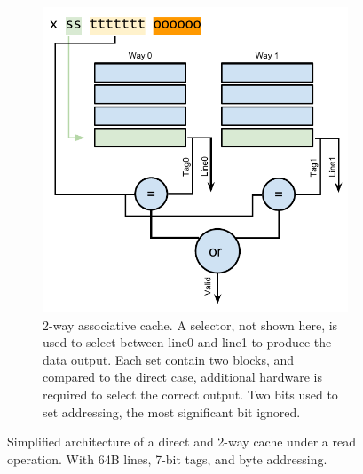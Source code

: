 \begin{figure}
\begin{subfigure}[b]{0.48\textwidth}
        \includegraphics[width=\textwidth]{figures/introduction/2waycache_read}
        \caption{2-way associative cache. A selector, not shown here, is used to select between line0 and line1 to produce the data output. Each set contain two blocks, and compared to the direct case, additional hardware is required to select the correct output. Two bits used to set addressing, the most significant bit ignored.}
        \label{fig:introduction:cache:2way}
    \end{subfigure}
    \caption{Simplified architecture of a direct and 2-way cache under a read operation. With 64B lines, 7-bit tags, and byte addressing.}
    \label{fig:introduction:cache}
\end{figure}

